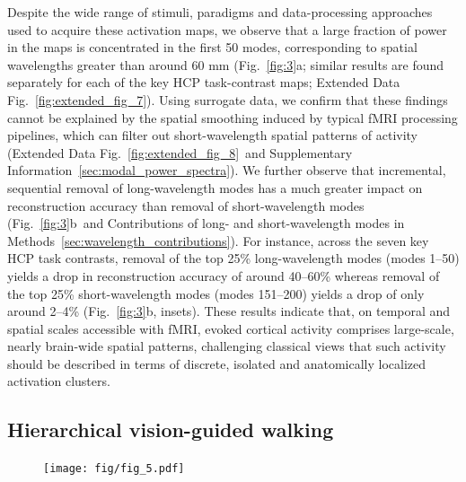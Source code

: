 \documentclass[sn-mathphys-num]{sn-jnl}%
\theoremstyle{thmstyleone}%
\theoremstyle{thmstyletwo}%
\theoremstyle{thmstylethree}%
\begin{document}
Despite the wide range of stimuli, paradigms and data-processing approaches used to acquire these activation maps, we observe that a large fraction of power in the maps is concentrated in the first 50 modes, corresponding to spatial wavelengths greater than around 60 mm (Fig.~\ref{fig:3}a; similar results are found separately for each of the key HCP task-contrast maps; Extended Data Fig.~\ref{fig:extended_fig_7}). 
Using surrogate data, we confirm that these findings cannot be explained by the spatial smoothing  induced by typical fMRI processing pipelines, which can filter out short-wavelength spatial patterns of activity (Extended Data Fig.~\ref{fig:extended_fig_8}~and Supplementary Information~\ref{sec:modal_power_spectra}). 
We further observe that incremental, sequential removal of long-wavelength modes has a much greater impact on reconstruction accuracy than removal of short-wavelength modes (Fig.~\ref{fig:3}b~and Contributions of long- and short-wavelength modes in Methods~\ref{sec:wavelength_contributions}). 
For instance, across the seven key HCP task contrasts, removal of the top 25\% long-wavelength modes (modes 1–50) yields a drop in reconstruction accuracy of around 40–60\% whereas removal of the top 25\% short-wavelength modes (modes 151–200) yields a drop of only around 2–4\% (Fig.~\ref{fig:3}b, insets). 
These results indicate that, on temporal and spatial scales accessible with fMRI, evoked cortical activity comprises large-scale, nearly brain-wide spatial patterns, challenging classical views that such activity should be described in terms of discrete, isolated and anatomically localized activation clusters.


\subsection{Hierarchical vision-guided walking}


\begin{figure}[!htb]
	\centering
	\texttt{[image: fig/fig\_5.pdf]}
	\caption{
	} \label{fig:fig_5}
\end{figure}
\end{document}
